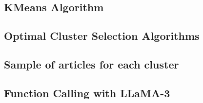 \subsection{KMeans Algorithm}


\newpage


\newpage
\subsection{Optimal Cluster Selection Algorithms}



\subsection{Sample of articles for each cluster}
\setcounter{table}{0}
\renewcommand{\thetable}{A\arabic{table}} %



\subsection{Function Calling with LLaMA-3}




